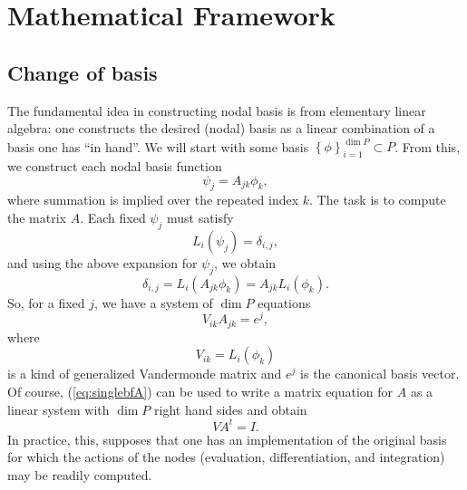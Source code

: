 \section{Mathematical Framework}
\subsection{Change of basis}


The fundamental idea in constructing nodal basis is from elementary
linear algebra: one constructs the desired (nodal) basis as a linear
combination of a basis one has ``in hand''.  We will start with some
basis \( \left\{ \phi \right\}_{i=1}^{\dim P} \subset P \).  From
this, we construct each nodal basis function
\begin{equation}
 \psi_j = A_{jk} \phi_k,
\end{equation}
where summation is implied over the repeated index \( k \).  The
task is to compute the matrix \( A \).  Each fixed \( \psi_j \) must
satisfy
\begin{equation}
L_i( \psi_j ) = \delta_{i,j},
\end{equation}
and using the above expansion for \( \psi_j \), we obtain
\begin{equation}
\delta_{i,j} = L_i( A_{jk} \phi_{k} ) = A_{jk} L_i (\phi_k).
\end{equation}
So, for a fixed \( j \), we have a system of \( \dim P \) equations
\begin{equation}
\label{eq:singlebfA}
V_{ik} A_{jk} = e^j,
\end{equation}
where
\begin{equation}
V_{ik} = L_i(\phi_k)
\end{equation}
is a kind of generalized Vandermonde matrix and \( e^j \) is the
canonical basis vector.  Of course, (\ref{eq:singlebfA}) can be used
to write a matrix equation for \( A \) as a linear system with \( \dim
P \) right hand sides and obtain
\begin{equation}
V A^t = I.
\end{equation}
In practice, this, supposes that one has an implementation of
the original basis for which the actions of the nodes (evaluation,
differentiation, and integration) may be readily computed.

